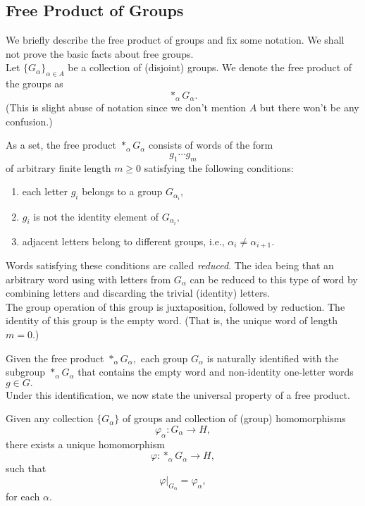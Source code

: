 \documentclass[12pt]{article}
\begin{document}
\subsection{Free Product of Groups}
We briefly describe the free product of groups and fix some notation. We shall not prove the basic facts about free groups. \\
Let $\{G_\alpha\}_{\alpha \in A}$ be a collection of (disjoint) groups. We denote the free product of the groups as
\begin{equation*} 
	*_\alpha G_\alpha.
\end{equation*}
(This is slight abuse of notation since we don't mention $A$ but there won't be any confusion.)

As a set, the free product $*_\alpha G_\alpha$ consists of words of the form
\begin{equation*} 
	g_1\cdots g_m
\end{equation*}
of arbitrary finite length $m \ge 0$ satisfying the following conditions:
\begin{enumerate}
	\item each letter $g_i$ belongs to a group $G_{\alpha_i},$
	\item $g_i$ is not the identity element of $G_{\alpha_i},$
	\item adjacent letters belong to different groups, i.e., $\alpha_i \neq \alpha_{i + 1}.$	
\end{enumerate}
Words satisfying these conditions are called \emph{reduced}. The idea being that an arbitrary word using with letters from $G_\alpha$ can be reduced to this type of word by combining letters and discarding the trivial (identity) letters.\\
The group operation of this group is juxtaposition, followed by reduction. The identity of this group is the empty word. (That is, the unique word of length $m = 0.$)

Given the free product $*_\alpha G_\alpha,$ each group $G_\alpha$ is naturally identified with the subgroup $*_\alpha G_\alpha$ that contains the empty word and non-identity one-letter words $g \in G.$\\
Under this identification, we now state the universal property of a free product.
\begin{thm}
	Given any collection $\{G_\alpha\}$ of groups and collection of (group) homomorphisms
	\begin{equation*} 
		\varphi_\alpha: G_\alpha \to H,
	\end{equation*}
	there exists a unique homomorphism
	\begin{equation*} 
		\varphi:*_\alpha G_\alpha \to H,
	\end{equation*}
	such that
	\begin{equation*} 
		\varphi|_{G_\alpha} = \varphi_\alpha,
	\end{equation*}
	for each $\alpha.$
\end{thm}
\end{document}
